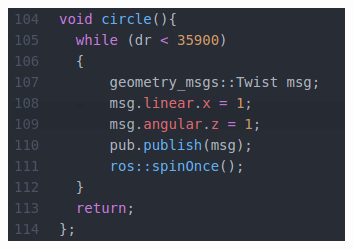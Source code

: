 \begin{figure}[h]
\begin{center}
\includegraphics[width=.5\textwidth]{figures/void-circle.png}
\end{center}
\end{figure}\label{fig:void-circle}
